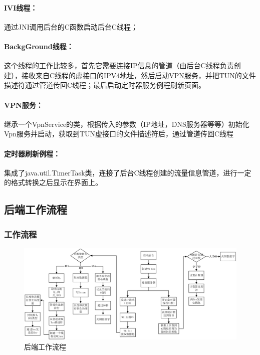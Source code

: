 \documentclass[paper=a4, fontsize=11pt, UTF8]{article} %
\numberwithin{equation}{section} %
\numberwithin{figure}{section} %
\numberwithin{table}{section} %
\begin{document}
\paragraph{IVI线程：} 通过JNI调用后台的C函数启动后台C线程；

\paragraph{BackgGround线程：} 这个线程的工作比较多，首先它需要连接IP信息的管道（由后台C线程负责创建），接收来自C线程的虚接口的IPV4地址，然后启动VPN服务，并把TUN的文件描述符通过管道传回C线程；最后启动定时器服务例程刷新页面。

\paragraph{VPN服务：} 继承一个VpnService的类，根据传入的参数（IP地址，DNS服务器等等）初始化Vpn服务并启动，获取到TUN虚接口的文件描述符后，通过管道传回C线程

\paragraph{ 定时器刷新例程：}集成了java.util.TimerTask类，连接了后台C线程创建的流量信息管道，进行一定的格式转换之后显示在界面上。

\newpage
\subsection{后端工作流程}

\subsubsection{工作流程}

\begin{figure}[htp]
\center
\includegraphics[width=\textwidth]{fig3}
\caption{后端工作流程}\label{fig3}
\end{figure}
\end{document}
